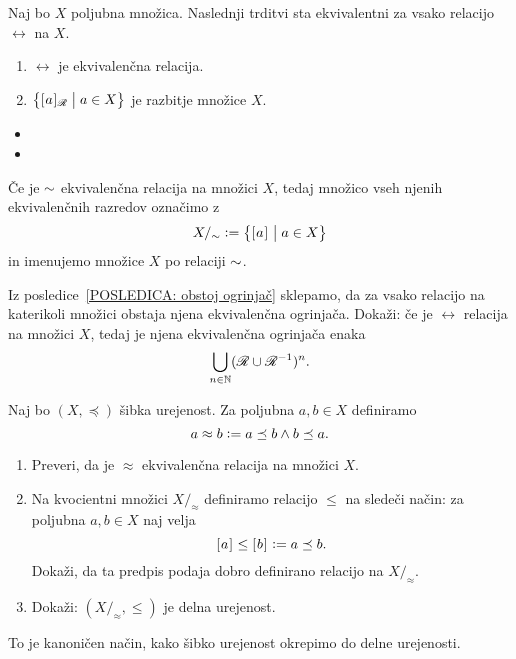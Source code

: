 		
		
		\begin{izrek}
			Naj bo $X$ poljubna množica. Naslednji trditvi sta ekvivalentni za vsako relacijo $\rel$ na $X$.
			\begin{enumerate}
				\item
					$\rel$ je ekvivalenčna relacija.
				\item
					$\set[1]{\ec[\rel]{a}}{a \in X}$ je razbitje množice $X$.
			\end{enumerate}
		\end{izrek}
		
		\begin{dokaz}
			\begin{itemize}
				\item{}
				\item{}
			\end{itemize}
		\end{dokaz}
		
		Če je $\sim$ ekvivalenčna relacija na množici $X$, tedaj množico vseh njenih ekvivalenčnih razredov označimo z
		\[X/_\equ \dfeq \set[1]{\ec{a}}{a \in X}\]
		in imenujemo  množice $X$ po relaciji $\sim$.
		
		
		\begin{vaja}
			Iz posledice~\ref{POSLEDICA: obstoj ogrinjač} sklepamo, da za vsako relacijo na katerikoli množici obstaja njena ekvivalenčna ogrinjača. Dokaži: če je $\rel$ relacija na množici $X$, tedaj je njena ekvivalenčna ogrinjača enaka
			\[\bigcup_{n \in \NN} (\rel \cup \rel^{-1})^n.\]
		\end{vaja}
		
		\begin{vaja}
			Naj bo $(X, \preceq)$ šibka urejenost. Za poljubna $a, b \in X$ definiramo
			\[a \approx b \mathrel{\mathop:}= a \preceq b \land b \preceq a.\]
			\begin{enumerate}
				\item
					Preveri, da je $\approx$ ekvivalenčna relacija na množici $X$.
				\item
					Na kvocientni množici $X/_\approx$ definiramo relacijo $\leq$ na sledeči način: za poljubna $a, b \in X$ naj velja
					\[[\:\!{a}\:\!]_{} \leq [\:\!{b}\:\!]_{} \mathrel{\mathop:}= a \preceq b.\]
					Dokaži, da ta predpis podaja dobro definirano relacijo na $X/_\approx$.
				\item
					Dokaži: $(X/_\approx, \leq)$ je delna urejenost.
			\end{enumerate}
			To je kanoničen način, kako šibko urejenost okrepimo do delne urejenosti.
		\end{vaja}
		
